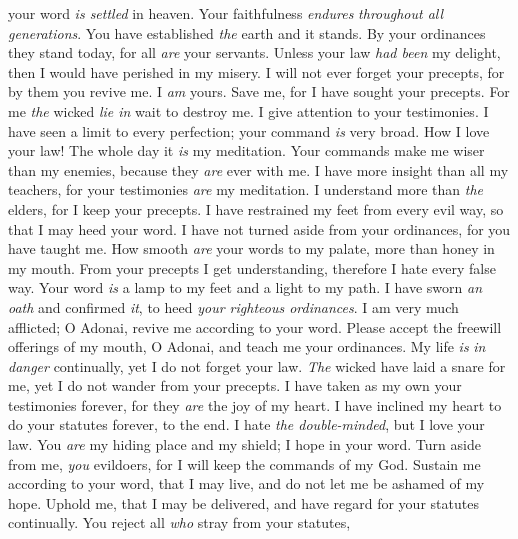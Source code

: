 \begin{biblechapter}
your word \textit{is settled} in heaven.
\verse Your faithfulness \textit{endures} \textit{throughout all generations}. 
You have established \textit{the} earth and it stands.
\verse By your ordinances they stand today, 
for all \textit{are} your servants.
\verse Unless your law \textit{had been} my delight, 
then I would have perished in my misery.
\verse I will not ever forget your precepts, 
for by them you revive me.
\verse I \textit{am} yours. Save me, 
for I have sought your precepts.
\verse For me \textit{the} wicked \textit{lie in} wait to destroy me. 
I give attention to your testimonies.
\verse I have seen a limit to every perfection; 
your command \textit{is} very broad.
 How I love your law! 
The whole day it \textit{is} my meditation.
\verse Your commands make me wiser than my enemies, 
because they \textit{are} ever with me.
\verse I have more insight than all my teachers, 
for your testimonies \textit{are} my meditation.
\verse I understand more than \textit{the} elders, 
for I keep your precepts.
\verse I have restrained my feet from every evil way, 
so that I may heed your word.
\verse I have not turned aside from your ordinances, 
for you have taught me.
\verse How smooth \textit{are} your words to my palate, 
more than honey in my mouth.
\verse From your precepts I get understanding, 
therefore I hate every false way.
 Your word \textit{is} a lamp to my feet 
and a light to my path.
\verse I have sworn \textit{an oath} and confirmed \textit{it}, 
to heed \textit{your righteous ordinances}.
\verse I am very much afflicted; 
O Adonai, revive me according to your word.
\verse Please accept the freewill offerings of my mouth, O Adonai, 
and teach me your ordinances.
\verse My life \textit{is} \textit{in danger} continually, 
yet I do not forget your law.
\verse \textit{The} wicked have laid a snare for me, 
yet I do not wander from your precepts.
\verse I have taken as my own your testimonies forever, 
for they \textit{are} the joy of my heart.
\verse I have inclined my heart to do your statutes 
forever, to the end.
 I hate \textit{the double-minded}, 
but I love your law.
\verse You \textit{are} my hiding place and my shield; 
I hope in your word.
\verse Turn aside from me, \textit{you} evildoers, 
for I will keep the commands of my God.
\verse Sustain me according to your word, that I may live, 
and do not let me be ashamed of my hope.
\verse Uphold me, that I may be delivered, 
and have regard for your statutes continually.
\verse You reject all \textit{who} stray from your statutes, 

\end{biblechapter}
